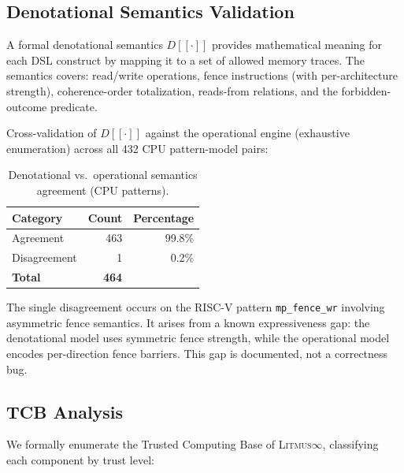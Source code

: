 \documentclass[11pt]{article}
\newcommand{\litmus}{\textsc{Litmus$\infty$}}
\begin{document}
\subsection{Denotational Semantics Validation}
\label{sec:denotational-semantics}

A formal denotational semantics $D[\![\cdot]\!]$ provides mathematical
meaning for each DSL construct by mapping it to a set of allowed
memory traces.  The semantics covers: read/write operations,
fence instructions (with per-architecture strength),
coherence-order totalization, reads-from relations, and
the forbidden-outcome predicate.

Cross-validation of $D[\![\cdot]\!]$ against the operational
engine (exhaustive enumeration) across all 432 CPU pattern-model pairs:

\begin{table}[ht]
\centering
\caption{Denotational vs.\ operational semantics agreement (CPU patterns).}
\label{tab:denotational-validation}
\small
\begin{tabular}{lrr}
\toprule
\textbf{Category} & \textbf{Count} & \textbf{Percentage} \\
\midrule
Agreement          & 463   & 99.8\% \\
Disagreement       & 1     & 0.2\% \\
\midrule
\textbf{Total}     & \textbf{464} & \\
\bottomrule
\end{tabular}
\end{table}

\noindent
The single disagreement occurs on the RISC-V pattern \texttt{mp\_fence\_wr}
involving asymmetric fence semantics.
It arises from a known expressiveness gap: the denotational model
uses symmetric fence strength, while the operational model
encodes per-direction fence barriers.  This gap is documented,
not a correctness bug.

\subsection{TCB Analysis}
\label{sec:tcb-analysis}

We formally enumerate the Trusted Computing Base of \litmus{},
classifying each component by trust level:
\end{document}
